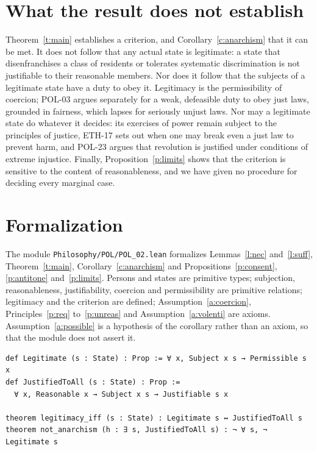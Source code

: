 \documentclass{situationist-preprint}
\begin{document}
\section{What the result does not establish}

Theorem~\ref{t:main} establishes a criterion, and Corollary~\ref{c:anarchism} that it can be met. It does not follow that any actual state is legitimate: a state that disenfranchises a class of residents or tolerates systematic discrimination is not justifiable to their reasonable members. Nor does it follow that the subjects of a legitimate state have a duty to obey it. Legitimacy is the permissibility of coercion; POL-03 argues separately for a weak, defeasible duty to obey just laws, grounded in fairness, which lapses for seriously unjust laws. Nor may a legitimate state do whatever it decides: its exercises of power remain subject to the principles of justice, ETH-17 sets out when one may break even a just law to prevent harm, and POL-23 argues that revolution is justified under conditions of extreme injustice. Finally, Proposition~\ref{p:limits} shows that the criterion is sensitive to the content of reasonableness, and we have given no procedure for deciding every marginal case.

\section{Formalization}

The module \nolinkurl{Philosophy/POL/POL_02.lean} formalizes Lemmas~\ref{l:nec} and~\ref{l:suff}, Theorem~\ref{t:main}, Corollary~\ref{c:anarchism} and Propositions~\ref{p:consent}, \ref{p:antitone} and~\ref{p:limits}. Persons and states are primitive types; subjection, reasonableness, justifiability, coercion and permissibility are primitive relations; legitimacy and the criterion are defined; Assumption~\ref{a:coercion}, Principles~\ref{p:req} to~\ref{p:unreas} and Assumption~\ref{a:volenti} are axioms. Assumption~\ref{a:possible} is a hypothesis of the corollary rather than an axiom, so that the module does not assert it.

\begin{lstlisting}
def Legitimate (s : State) : Prop := ∀ x, Subject x s → Permissible s x
def JustifiedToAll (s : State) : Prop :=
  ∀ x, Reasonable x → Subject x s → Justifiable s x

theorem legitimacy_iff (s : State) : Legitimate s ↔ JustifiedToAll s
theorem not_anarchism (h : ∃ s, JustifiedToAll s) : ¬ ∀ s, ¬ Legitimate s
\end{lstlisting}
\end{document}
